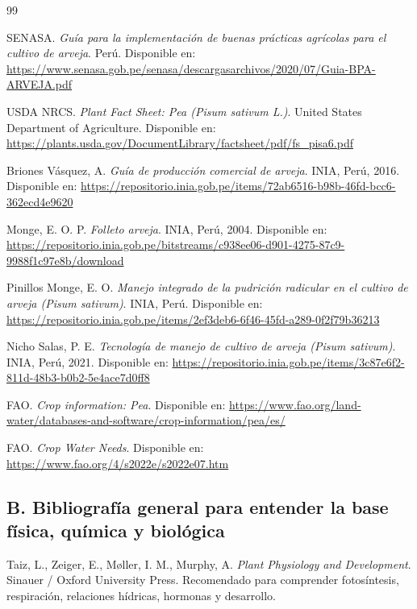 \documentclass[11pt,a4paper]{article}
\begin{document}
\begin{thebibliography}{99}

SENASA.
\newblock \emph{Guía para la implementación de buenas prácticas agrícolas para el cultivo de arveja}.
\newblock Perú.
\newblock Disponible en: \url{https://www.senasa.gob.pe/senasa/descargasarchivos/2020/07/Guia-BPA-ARVEJA.pdf}

USDA NRCS.
\newblock \emph{Plant Fact Sheet: Pea (\textit{Pisum sativum} L.)}.
\newblock United States Department of Agriculture.
\newblock Disponible en: \url{https://plants.usda.gov/DocumentLibrary/factsheet/pdf/fs_pisa6.pdf}

Briones Vásquez, A.
\newblock \emph{Guía de producción comercial de arveja}.
\newblock INIA, Perú, 2016.
\newblock Disponible en: \url{https://repositorio.inia.gob.pe/items/72ab6516-b98b-46fd-bcc6-362ecd4e9620}

Monge, E. O. P.
\newblock \emph{Folleto arveja}.
\newblock INIA, Perú, 2004.
\newblock Disponible en: \url{https://repositorio.inia.gob.pe/bitstreams/c938ee06-d901-4275-87c9-9988f1c97e8b/download}

Pinillos Monge, E. O.
\newblock \emph{Manejo integrado de la pudrición radicular en el cultivo de arveja (\textit{Pisum sativum})}.
\newblock INIA, Perú.
\newblock Disponible en: \url{https://repositorio.inia.gob.pe/items/2ef3deb6-6f46-45fd-a289-0f2f79b36213}

Nicho Salas, P. E.
\newblock \emph{Tecnología de manejo de cultivo de arveja (\textit{Pisum sativum})}.
\newblock INIA, Perú, 2021.
\newblock Disponible en: \url{https://repositorio.inia.gob.pe/items/3c87e6f2-811d-48b3-b0b2-5e4ace7d0ff8}

FAO.
\newblock \emph{Crop information: Pea}.
\newblock Disponible en: \url{https://www.fao.org/land-water/databases-and-software/crop-information/pea/es/}

FAO.
\newblock \emph{Crop Water Needs}.
\newblock Disponible en: \url{https://www.fao.org/4/s2022e/s2022e07.htm}

\subsection*{B. Bibliografía general para entender la base física, química y biológica}

Taiz, L., Zeiger, E., Møller, I. M., Murphy, A.
\newblock \emph{Plant Physiology and Development}.
\newblock Sinauer / Oxford University Press.
\newblock Recomendado para comprender fotosíntesis, respiración, relaciones hídricas, hormonas y desarrollo.


\end{thebibliography}
\end{document}
